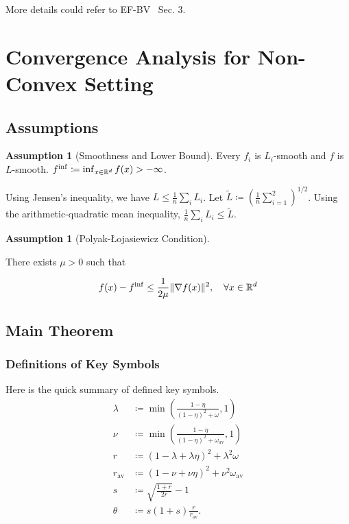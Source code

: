 \documentclass{article} %
\newcommand{\algname}[1]{{\sf\green\relscale{0.90}#1}\xspace}
\newcommand{\eqdef}{\coloneqq}
\theoremstyle{plain}
\theoremstyle{definition}
\newtheorem{assumption}[theorem]{Assumption}
\theoremstyle{remark}
\newcommand{\green}{\color{mydarkgreen}}
\newcommand{\oma}{\omega_{\mathrm{av}}}
\begin{document}
More details could refer to \algname{EF-BV}~\cite{condat2022ef} Sec. 3.

\section{Convergence Analysis for Non-Convex Setting}
   \subsection{Assumptions}
   \begin{assumption}[Smoothness and Lower Bound]\label{assump:smooth}
      Every $f_i$ is $L_i$-smooth and $f$ is $L$-smooth. $f^{\inf}\eqdef \inf_{x\in \R^d} f(x) > -\infty$.
   \end{assumption}

   Using Jensen's inequality, we have $L\leq \frac{1}{n}\sum_{i}L_i$. Let $\tilde{L}\eqdef (\frac{1}{n}\sum_{i=1}^2)^{1/2}$. Using the arithmetic-quadratic mean inequality, $\frac{1}{n}\sum_{i}L_i \leq \tilde{L}$.

   \begin{assumption}[Polyak-Łojasiewicz Condition]\label{assump:pl}
      
      There exists $\mu>0$ such that 

      \begin{equation}
         f(x) - f^{\inf} \leq \frac{1}{2\mu} \| \nabla f(x)\|^2, \quad \forall x\in\mathbb{R}^d
      \end{equation}
   \end{assumption}

   \subsection{Main Theorem}
   \subsubsection{Definitions of Key Symbols}
   Here is the quick summary of defined key symbols. 
   \begin{equation*}
      \begin{aligned}
         \lambda &\eqdef \min \left(\frac{1-\eta}{(1-\eta)^2 + \omega}, 1\right)\\
         \nu &\eqdef \min \left(\frac{1-\eta}{(1-\eta)^2 + \oma}, 1\right)\\
         r &\eqdef (1 - \lambda + \lambda \eta)^2 + \lambda^2 \omega\\
         r_{\mathrm{av}} &\eqdef (1 - \nu + \nu \eta)^2 + \nu^2 \oma\\
         s &\eqdef \sqrt{\frac{1+r}{2r}}-1\\
         \theta &\eqdef s(1+s)\frac{r}{r_{\mathrm{av}}}.
      \end{aligned}   
   \end{equation*} 
\end{document}
